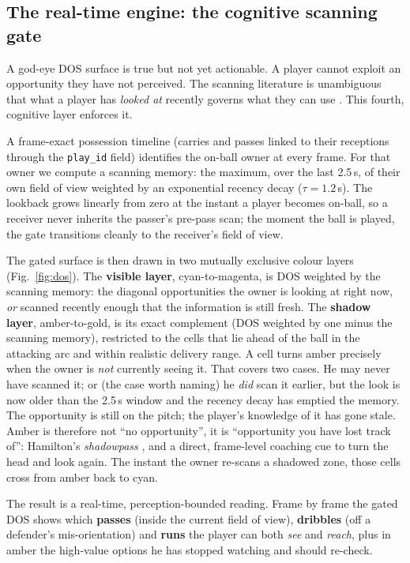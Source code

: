 \documentclass[11pt]{article}
\begin{document}
\subsection{The real-time engine: the cognitive scanning gate}
\label{sec:gate}

A god-eye DOS surface is true but not yet actionable. A player cannot
exploit an opportunity they have not perceived. The scanning
literature is unambiguous that what a player has \emph{looked at} recently
governs what they can use \citep{jordet2013,mcguckian2018}. This fourth,
cognitive layer enforces it.

A frame-exact possession timeline (carries and passes linked to their
receptions through the \texttt{play\_id} field) identifies the on-ball
owner at every frame. For that owner we compute a scanning memory: the
maximum, over the last 2.5\,s, of their own field of view weighted by an
exponential recency decay ($\tau=1.2$\,s). The lookback grows linearly
from zero at the instant a player becomes on-ball, so a receiver never
inherits the passer's pre-pass scan; the moment the ball is played, the
gate transitions cleanly to the receiver's field of view.

The gated surface is then drawn in two mutually exclusive colour layers
(Fig.~\ref{fig:dos}). The \textbf{visible layer}, cyan-to-magenta, is DOS
weighted by the scanning memory: the diagonal opportunities the owner is
looking at right now, \emph{or} scanned recently enough that the
information is still fresh. The \textbf{shadow layer}, amber-to-gold, is
its exact complement (DOS weighted by one minus the scanning memory),
restricted to the cells that lie ahead of the ball in the attacking arc
and within realistic delivery range. A cell turns amber precisely when the
owner is \emph{not} currently seeing it. That covers two cases. He may
never have scanned it; or (the case worth naming) he \emph{did} scan
it earlier, but the look is now older than the 2.5\,s window and the
recency decay has emptied the memory. The opportunity is still on the
pitch; the player's knowledge of it has gone stale. Amber is therefore not
``no opportunity'', it is ``opportunity you have lost track of'':
Hamilton's \emph{shadowpass} \citep{hamilton2024}, and a direct,
frame-level coaching cue to turn the head and look again. The instant the
owner re-scans a shadowed zone, those cells cross from amber back to cyan.

The result is a real-time, perception-bounded reading. Frame by frame the
gated DOS shows which \textbf{passes} (inside the current field of view),
\textbf{dribbles} (off a defender's mis-orientation) and \textbf{runs} the
player can both \emph{see} and \emph{reach}, plus in amber the high-value
options he has stopped watching and should re-check.
\end{document}
